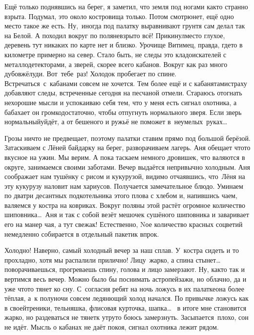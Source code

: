 Ещё только поднявшись на берег, я заметил, что земля под ногами как\sdash то странно взрыта. Подумал, это около костровища только. Потом смотрю\mdash нет, ещё одно место такое же есть. Ну,~иногда под палатку выравнивают грунт\mdash я сам делал так на Белой. А походил вокруг по поляне\mdash взрыто всё! Прикинул\mdash место глухое, деревень тут никаких по карте нет и близко. Урочище Витимец, правда, где\sdash то в километре примерно на север. Стало быть, не следы это кладоискателей с металлодетекторами, а зверей, скорее всего кабанов. Вокруг как раз много дубов\mdash жёлуди. Вот~тебе~раз! Холодок пробегает по спине. Встречаться~с~кабанами совсем не хочется. Тем более ещё и с кабанятами\mdash страху добавляют следы, встреченные сегодня на песчаной отмели. Стараюсь отогнать нехорошие мысли и успокаиваю себя тем, что у меня есть сигнал охотника, а бабахает он громко\mdash достаточно, чтобы отпугнуть нормального зверя. Если зверь нормальный\mdash уйдёт, а от бешеного и ружьё не поможет в~неумелых~руках\ldots 

Грозы ничто не предвещает, поэтому палатки ставим прямо под большой берёзой. Затаскиваем с Лёней байдарку на берег, разворачиваем лагерь. Аня обещает что\sdash то вкусное на ужин. Мы верим. А пока таскаем немного дровишек, что валяются в округе, занимаемся своими заботами. Вечер выдаётся непривычно холодным. Аня соображает нам тушёнку с рисом и кукурузой, видимо отчаявшись, что~Лёня на эту кукурузу наловит нам хариусов. Получается замечательное блюдо. Уминаем по два\sdash три десантных подкотельника этого плова с хлебом и, напившись чаем, валяемся у костра на ковриках. Вокруг поляны этой растёт огромное количество шиповника\ldots~Аня и так с собой везёт мешочек сушёного шиповника и заваривает его на манер чая, а тут свежак! Естественно, N\sdash ое количество красных соцветий немедленно собирается в отдельный пакетик впрок.

Холодно! Наверно, самый холодный вечер за наш сплав. У~костра сидеть и то прохладно, хотя мы распалили прилично! Лицу~жарко, а спина стынет\ldots~ поворачиваешься, прогреваешь спину, голова и лицо замерзают. Ну, как\sdash то так и вертимся весь вечер. Можно было бы поснимать астропейзажи, но облачно, да и уже что\sdash то тянет ко сну. С~согласия ребят на ночь ложусь в их палатке\mdash она более тёплая, а~к полуночи совсем ледянющий холод начался. По привычке ложусь как в своей\mdash треники, тельняшка, флисовая курточка, шапка\ldots~ в итоге мне становится жарко, но раздеваться не тянет\mdash к утру\sdash то боюсь замерзнуть. Засыпается~плохо, сон не идёт. Мысль о кабанах не даёт покоя, сигнал охотника лежит рядом. 

\begin{center}
\end{center}